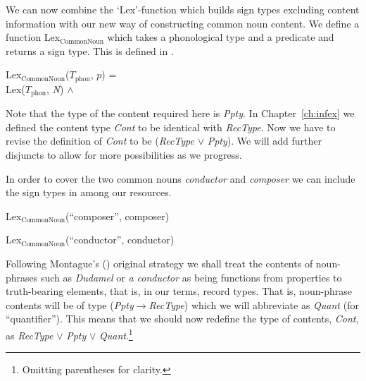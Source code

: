 We can now combine the `Lex'-function which builds sign types
excluding content information with our new way of constructing common
noun content.  We define a function Lex$_{\mathrm{CommonNoun}}$ which
takes a phonological type and a predicate and returns a sign type.
This is defined in \nexteg{}.
\begin{ex} 
Lex$_{\mathrm{CommonNoun}}$($T_{\mathrm{phon}}$, $p$) = \\
\hspace*{1em}Lex($T_{\mathrm{phon}}$, \textit{N}) \d{$\wedge$}  
\end{ex} 
Note that the type of the content required here is \textit{Ppty}.  In
Chapter~\ref{ch:infex} we defined the content type \textit{Cont} to be
identical with \textit{RecType}.  Now we have to revise the definition
of \textit{Cont} to be (\textit{RecType} $\vee$ \textit{Ppty}).  We
will add further disjuncts to allow for more possibilities as we
progress.

In order to cover the two common nouns \textit{conductor} and
\textit{composer} we can include the sign types in \nexteg{} among our
resources.
\begin{ex} 
\begin{subex} 
 
\item Lex$_{\mathrm{CommonNoun}}$(``composer'', composer) 
 
\item Lex$_{\mathrm{CommonNoun}}$(``conductor'', conductor) 
 
\end{subex} 
   
\end{ex} 

Following Montague's (\citeyear{Montague1973}) original strategy we
shall treat the contents of noun-phrases such as \textit{Dudamel} or
\textit{a conductor} as being functions from properties to
truth-bearing elements, that is, in our terms, record types.  That is,
noun-phrase contents will be of type
(\textit{Ppty}$\rightarrow$\textit{RecType}) which we will abbreviate
as \textit{Quant} (for ``quantifier''). This means that we should now
redefine the type of contents, \textit{Cont}, as \textit{RecType}
$\vee$ \textit{Ppty} $\vee$ \textit{Quant}.\footnote{Omitting
  parentheses for clarity.}
   

